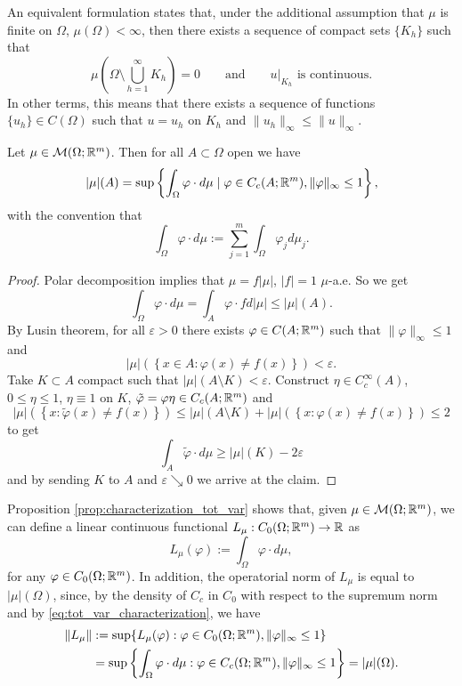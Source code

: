 \begin{remark}
An equivalent formulation states that, under the additional assumption that $\mu$ is finite on $\Omega$, $\mu(\Omega) < \infty$, then there exists a sequence of compact sets $\{K_h\}$ such that
\[
\mu \left (\Omega \setminus \bigcup_{h = 1}^{\infty} K_h \right ) = 0
\qquad \text{and} \qquad
u\big|_{K_h} \text{ is continuous}.
\]
In other terms, this means that there exists a sequence of functions $\{u_h\} \in C(\Omega)$ such that $u = u_h$ on $K_h$ and $\|u_h\|_\infty
\leq \|u\|_\infty$.
\end{remark}

\begin{proposition} \label{prop:characterization_tot_var}
Let $\mu \in \mathcal{M}(\Omega;\mathbb{R}^m)$. Then for all $A\subset \Omega$ open we have 
\begin{equation} \label{eq:tot_var_characterization}
|\mu|(A) = \sup\left\{ \int_\Omega \varphi \cdot d\mu \mid 
\varphi \in C_c(A;\mathbb{R}^m), \|\varphi\|_\infty \leq 1\right\},
\end{equation}
with the convention that
\[
\int_\Omega \varphi \cdot d\mu := \sum_{j=1}^m \int_\Omega \varphi_j d\mu_j.
\]
\end{proposition}

\begin{proof}
Polar decomposition implies that
$\mu = f|\mu|$, $|f| =1 $ $\mu$-a.e. So we get
\[
\int_\Omega \varphi \cdot d\mu = \int_A \varphi \cdot fd|\mu| \leq |\mu|(A).
\]
By Lusin theorem, for all $\varepsilon > 0$ there exists $\varphi \in
C(A;\mathbb{R}^m)$ such that $\|\varphi\|_\infty \leq 1$ and 
\[
|\mu|\left(\left\{x \in A : \varphi(x) \neq f(x)\right\}\right) < \varepsilon.
\]
Take $K \subset A$ compact such that $|\mu|(A\setminus K) < \varepsilon$.
Construct $\eta \in C^\infty_c(A)$, $0 \leq \eta \leq 1$, $\eta \equiv 1$ on
$K$, $\tilde \varphi = \varphi \eta \in C_c(A;\mathbb{R}^m)$ and 
\[
|\mu|\left(\left\{ x: \tilde \varphi(x) \neq f(x) \right\}\right)
\leq
|\mu|(A\setminus K)
+
|\mu|\left(\left\{ x: \varphi(x) \neq f(x) \right\}\right)
\leq 2
\]
to get 
\[
\int_A \tilde \varphi \cdot d\mu \geq |\mu|(K) - 2 \varepsilon 
\]
and by sending $K$ to $A$ and $\varepsilon \searrow 0$ we arrive at the claim.
\end{proof}


Proposition \ref{prop:characterization_tot_var} shows that, given $\mu \in \mathcal{M}(\Omega;\mathbb{R}^m)$, we can define a linear continuous functional $L_{\mu} : C_{0}(\Omega; \mathbb{R}^{m}) \to \mathbb{R}$ as
\begin{equation*}
L_{\mu}(\varphi) := \int_{\Omega} \varphi \cdot d \mu,
\end{equation*}
for any $\varphi \in C_{0}(\Omega; \mathbb{R}^{m})$. In addition, the operatorial norm of $L_{\mu}$ is equal to $|\mu|(\Omega)$, since, by the density of $C_{c}$ in $C_{0}$ with respect to the supremum norm and by \eqref{eq:tot_var_characterization}, we have
\begin{align*}
\|L_{\mu}\| & := \sup\{ L_{\mu}(\varphi) : \varphi \in C_{0}(\Omega; \mathbb{R}^{m}), \|\varphi\|_{\infty} \le 1 \} \\
& = \sup\left\{ \int_\Omega \varphi \cdot d\mu : 
\varphi \in C_c(\Omega;\mathbb{R}^m), \|\varphi\|_\infty \leq 1\right\} = |\mu|(\Omega).
\end{align*}

